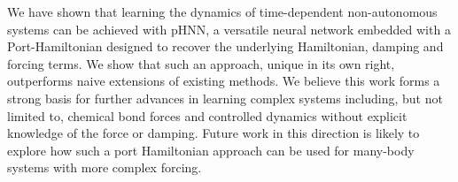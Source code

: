 \documentclass{article}
\begin{document}
We have shown that learning the dynamics of time-dependent non-autonomous systems can be achieved with pHNN, a versatile neural network embedded with a Port-Hamiltonian designed to recover the underlying Hamiltonian, damping and forcing terms. We show that such an approach, unique in its own right, outperforms naive extensions of existing methods. We believe this work forms a strong basis for further advances in learning complex systems including, but not limited to, chemical bond forces and controlled dynamics without explicit knowledge of the force or damping. Future work in this direction is likely to explore how such a port Hamiltonian approach can be used for many-body systems with more complex forcing.

\pagebreak


\end{document}

